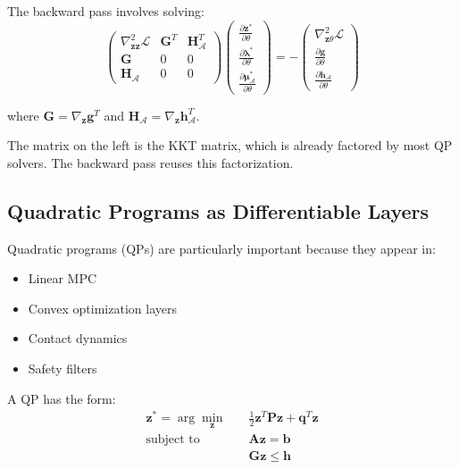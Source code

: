 The backward pass involves solving:
\begin{equation}
\begin{pmatrix}
\nabla^2_{\mathbf{z}\mathbf{z}} \mathcal{L} & \mathbf{G}^T & \mathbf{H}_{\mathcal{A}}^T \\
\mathbf{G} & 0 & 0 \\
\mathbf{H}_{\mathcal{A}} & 0 & 0
\end{pmatrix}
\begin{pmatrix}
\frac{\partial \mathbf{z}^*}{\partial \theta} \\
\frac{\partial \boldsymbol{\lambda}^*}{\partial \theta} \\
\frac{\partial \boldsymbol{\mu}_{\mathcal{A}}^*}{\partial \theta}
\end{pmatrix}
= -\begin{pmatrix}
\nabla^2_{\mathbf{z}\theta} \mathcal{L} \\
\frac{\partial \mathbf{g}}{\partial \theta} \\
\frac{\partial \mathbf{h}_{\mathcal{A}}}{\partial \theta}
\end{pmatrix}
\label{eq:kkt_sensitivity}
\end{equation}

where $\mathbf{G} = \nabla_{\mathbf{z}} \mathbf{g}^T$ and $\mathbf{H}_{\mathcal{A}} = \nabla_{\mathbf{z}} \mathbf{h}_{\mathcal{A}}^T$.

The matrix on the left is the KKT matrix, which is already factored by most QP solvers. The backward pass reuses this factorization.

\subsection{Quadratic Programs as Differentiable Layers}

Quadratic programs (QPs) are particularly important because they appear in:
\begin{itemize}
    \item Linear MPC
    \item Convex optimization layers
    \item Contact dynamics
    \item Safety filters
\end{itemize}

A QP has the form:
\begin{equation}
\begin{aligned}
\mathbf{z}^* = \arg\min_{\mathbf{z}} \quad & \frac{1}{2} \mathbf{z}^T \mathbf{P} \mathbf{z} + \mathbf{q}^T \mathbf{z} \\
\text{subject to} \quad & \mathbf{A} \mathbf{z} = \mathbf{b} \\
& \mathbf{G} \mathbf{z} \leq \mathbf{h}
\end{aligned}
\end{equation}

